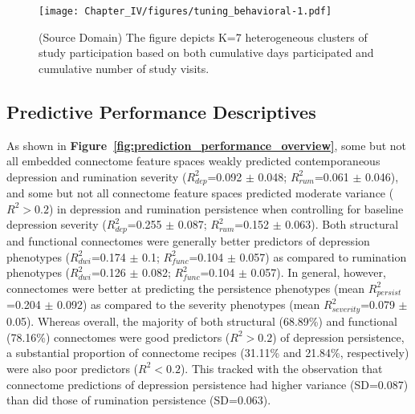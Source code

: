\documentclass[
  notitlepage]{article}
\begin{document}
\begin{figure}
\centering
\texttt{[image: Chapter\_IV/figures/tuning\_behavioral-1.pdf]}
\caption{(Source Domain) \label{fig:tuning_set_longitudinal_profiles}\scriptsize{The figure depicts K=7 heterogeneous clusters of study participation based on both cumulative days participated and cumulative number of study visits.}}
\end{figure}
\setlength{\belowcaptionskip}{-10pt}

\hypertarget{predictive-performance-descriptives}{%
\subsection{Predictive Performance
Descriptives}\label{predictive-performance-descriptives}}
As shown in \textbf{Figure~\ref{fig:prediction_performance_overview}}, some but
not all embedded connectome feature spaces weakly predicted
contemporaneous depression and rumination severity
(\(R^{2}_{dep}\)=0.092 \(\pm\) 0.048; \(R^{2}_{rum}\)=0.061 \(\pm\)
0.046), and some but not all connectome feature spaces predicted
moderate variance (\(R^{2}>0.2\)) in depression and rumination
persistence when controlling for baseline depression severity
(\(R^{2}_{dep}\)=0.255 \(\pm\) 0.087; \(R^{2}_{rum}\)=0.152 \(\pm\)
0.063). Both structural and functional connectomes were generally better
predictors of depression phenotypes (\(R^{2}_{dwi}\)=0.174 \(\pm\) 0.1;
\(R^{2}_{func}\)=0.104 \(\pm\) 0.057) as compared to rumination
phenotypes (\(R^{2}_{dwi}\)=0.126 \(\pm\) 0.082; \(R^{2}_{func}\)=0.104
\(\pm\) 0.057). In general, however, connectomes were better at
predicting the persistence phenotypes (mean \(R^{2}_{persist}\)=0.204
\(\pm\) 0.092) as compared to the severity phenotypes (mean
\(R^{2}_{severity}\)=0.079 \(\pm\) 0.05). Whereas overall, the majority
of both structural (68.89\%) and functional (78.16\%) connectomes were
good predictors (\(R^{2}>0.2\)) of depression persistence, a substantial
proportion of connectome recipes (31.11\% and 21.84\%, respectively)
were also poor predictors (\(R^{2}<0.2\)). This tracked with the
observation that connectome predictions of depression persistence had
higher variance (SD=0.087) than did those of rumination persistence
(SD=0.063).
\end{document}
